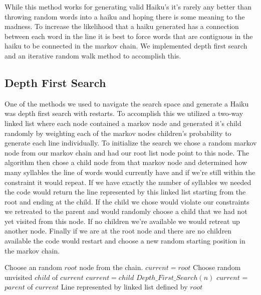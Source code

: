 \documentclass[]{article}
\begin{document}
While this method works for generating valid Haiku's it's rarely any better than throwing random words into a haiku and hoping there is some meaning to the madness. To increase the likelihood that a haiku generated has a connection between each word in the line it is best to force words that are contiguous in the haiku to be connected in the markov chain. We implemented depth first search and an iterative random walk method to accomplish this.

\subsection{Depth First Search}
One of the methods we used to navigate the search space and generate a Haiku was depth first search with restarts. To accomplish this we utilized a two-way linked list where each node contained a markov node and generated it's child randomly by weighting each of the markov nodes children's probability to generate each line individually. To initialize the search we chose a random markov node from our markov chain and had our root list node point to this node. The algorithm then chose a child node from that markov node and determined how many syllables the line of words would currently have and if we're still within the constraint it would repeat. If we have exactly the number of syllables we needed the code would return the line represented by this linked list starting from the root and ending at the child. If the child we chose would violate our constraints we retreated to the parent and would randomly choose a child that we had not yet visited from this node. If no children we're available we would retreat up another node. Finally if we are at the root node and there are no children available the code would restart and choose a new random starting position in the markov chain.

\begin{algorithm}[H]
	\caption{$Depth\_First\_Search(n)$} \label{DFSB}
	\begin{algorithmic}[1]
		\State Choose an random $root$ node from the chain.
		\State $current = root$
				\State Choose random unvisited $child$ of $current$
					\State $current = child$
				\EndIf
			\Else
					\Return $Depth\_First\_Search(n)$
				\Else
					\State $current$ = $parent$ of $current$
				\EndIf
			\EndIf
		\EndWhile
		\Return Line represented by linked list defined by $root$
	\end{algorithmic}
\end{algorithm}
\end{document}
